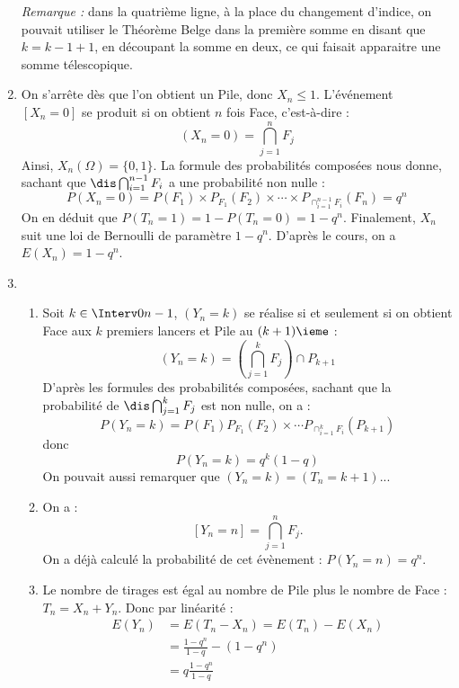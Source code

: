 \documentclass[a4paper,10pt]{report}
\begin{document}
\begin{enumerate}
\noindent \textit{Remarque :} dans la quatrième ligne, à la place du changement d'indice, on pouvait utiliser le Théorème Belge dans la première somme en disant que $k=k-1+1$, en découpant la somme en deux, ce qui faisait apparaitre une somme télescopique.
\item On s'arrête dès que l'on obtient un Pile, donc $X_n \leq 1$. L'événement $[X_n = 0]$ se produit si on obtient $n$ fois Face, c'est-à-dire :
$$(X_n=0) = \bigcap_{j=1}^n F_j$$
Ainsi, $X_n(\Omega) = \{0,1\}$. La formule des probabilités composées nous donne, sachant que $\dis \bigcap_{i=1}^{n-1} F_i$ a une probabilité non nulle :
$$ P(X_n=0) = P(F_1) \times P_{F_1}(F_2) \times \cdots \times P_{\cap_{i=1}^{n-1} F_i}(F_n) = q^n$$
On en déduit que $P(T_n=1) = 1-P(T_n=0) = 1-q^n$. Finalement, $X_n$ suit une loi de Bernoulli de paramètre $1-q^n$. D'après le cours, on a $E(X_n) = 1-q^n$.
\item 
\begin{enumerate}
\item Soit $k \in \Interv 0{n-1}$, $(Y_n=k)$ se réalise si et seulement si on obtient Face aux $k$ premiers lancers et Pile au $(k+1)\ieme$ :
$$(Y_n=k) = \left( \bigcap_{j=1}^k F_j \right) \cap P_{k+1}$$
D'après les formules des probabilités composées, sachant que la probabilité de $\dis \bigcap_{j=1}^k F_j$ est non nulle, on a :
\[ P(Y_n=k) = P(F_1) P_{F_1}(F_2) \times \cdots P_{\cap_{i=1}^k F_i}(P_{k+1}) \]
donc 
$$ P(Y_n = k) = q^k (1-q)$$
On pouvait aussi remarquer que $(Y_n=k)=(T_{n}=k+1)$...
\item On a : $$[Y_n=n]= \bigcap_{j=1}^n F_j.$$ On a déjà calculé la probabilité de cet évènement : $P(Y_n = n) = q^n$.
\item  Le nombre de tirages est égal au nombre de Pile plus le nombre de Face : $T_n=X_n+Y_n$. Donc par linéarité :
\begin{align*}
        E(Y_n) & = E(T_n - X_n) = E(T_n) - E(X_n) \\
         & = \frac{1-q^n}{1-q} - (1-q^n)\\
         &= q \frac{1-q^n}{1-q}
       \end{align*}
\end{enumerate}
\end{enumerate}
\end{document}
